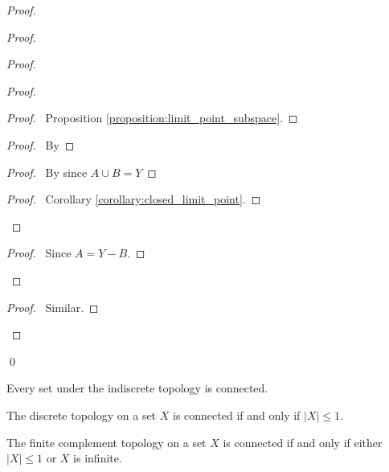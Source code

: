\begin{proof}
\begin{proof}
        \begin{proof}
            \begin{proof}
                \begin{proof}
                    \pf\ Proposition \ref{proposition:limit_point_subspace}.
                \end{proof}
                \begin{proof}
                    \pf\ By 
                \end{proof}
                \begin{proof}
                    \pf\ By  since $A \cup B = Y$
                \end{proof}
                \qedstep
                \begin{proof}
                    \pf\ Corollary \ref{corollary:closed_limit_point}.
                \end{proof}
            \end{proof}
            \qedstep
            \begin{proof}
                \pf\ Since $A = Y - B$.
            \end{proof}
        \end{proof}
        \begin{proof}
            \pf\ Similar.
        \end{proof}
    \end{proof}
    \qed
\end{proof}

\begin{example}
    Every set under the indiscrete topology is connected.
\end{example}

\begin{example}
    The discrete topology on a set $X$ is connected if and only if $|X| \leq 1$.
\end{example}

\begin{example}
    The finite complement topology on a set $X$ is connected if and only if either $|X| \leq 1$ or $X$ is infinite.
\end{example}

